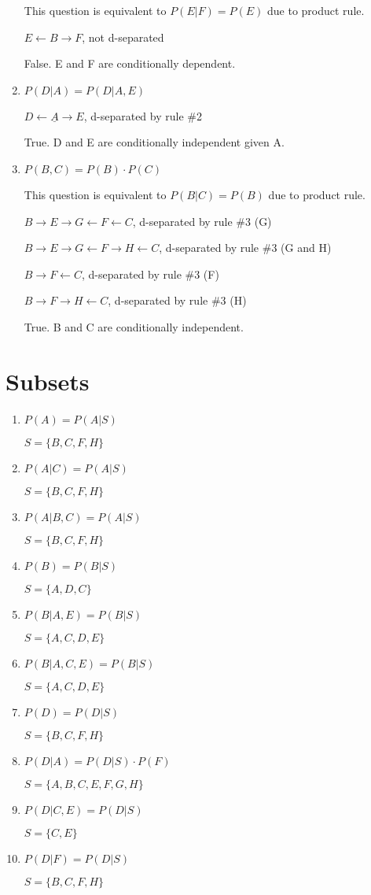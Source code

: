 \documentclass[11]{article}
\begin{document}
\begin{enumerate}[label=(\alph*)]
This question is equivalent to $P(E|F)=P(E)$ due to product rule.

$E \leftarrow B \rightarrow F$, not d-separated

False. E and F are conditionally dependent.
\item $P(D|A)=P(D|A,E)$

$D \leftarrow \underline{A} \rightarrow E$, d-separated by rule \#2

True. D and E are conditionally independent given A.
\item $P(B,C)=P(B) \cdot P(C)$

This question is equivalent to $P(B|C)=P(B)$ due to product rule.

$B \rightarrow E \rightarrow G \leftarrow F \leftarrow C$, d-separated by rule \#3 (G)

$B \rightarrow E \rightarrow G \leftarrow F \rightarrow H \leftarrow C$, d-separated by rule \#3 (G and H)

$B \rightarrow F \leftarrow C$, d-separated by rule \#3 (F)

$B \rightarrow F \rightarrow H \leftarrow C$, d-separated by rule \#3 (H)

True. B and C are conditionally independent.
\end{enumerate}

\section{Subsets}
\begin{enumerate}[label=(\alph*)]
\item $P(A)=P(A|S)$

$S=\{B,C,F,H\}$
\item $P(A|C)=P(A|S)$

$S=\{B,C,F,H\}$
\item $P(A|B,C)=P(A|S)$

$S=\{B,C,F,H\}$
\item $P(B)=P(B|S)$

$S=\{A,D,C\}$
\item $P(B|A,E)=P(B|S)$

$S=\{A,C,D,E\}$
\item $P(B|A,C,E)=P(B|S)$

$S=\{A,C,D,E\}$
\item $P(D)=P(D|S)$

$S=\{B,C,F,H\}$
\item $P(D|A)=P(D|S) \cdot P(F)$

$S=\{A,B,C,E,F,G,H\}$
\item $P(D|C,E)=P(D|S)$

$S=\{C,E\}$
\item $P(D|F)=P(D|S)$

$S=\{B,C,F,H\}$
\end{enumerate}
\end{document}
